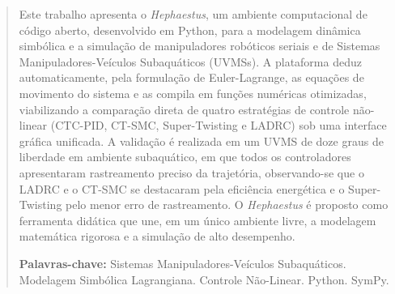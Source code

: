 \begin{abstract}
Este trabalho apresenta o \textit{Hephaestus}, um ambiente computacional de código aberto, desenvolvido em Python, para a modelagem dinâmica simbólica e a simulação de manipuladores robóticos seriais e de Sistemas Manipuladores-Veículos Subaquáticos (UVMSs). A plataforma deduz automaticamente, pela formulação de Euler-Lagrange, as equações de movimento do sistema e as compila em funções numéricas otimizadas, viabilizando a comparação direta de quatro estratégias de controle não-linear (CTC-PID, CT-SMC, Super-Twisting e LADRC) sob uma interface gráfica unificada. A validação é realizada em um UVMS de doze graus de liberdade em ambiente subaquático, em que todos os controladores apresentaram rastreamento preciso da trajetória, observando-se que o LADRC e o CT-SMC se destacaram pela eficiência energética e o Super-Twisting pelo menor erro de rastreamento. O \textit{Hephaestus} é proposto como ferramenta didática que une, em um único ambiente livre, a modelagem matemática rigorosa e a simulação de alto desempenho.

\textbf{Palavras-chave:} Sistemas Manipuladores-Veículos Subaquáticos. Modelagem Simbólica Lagrangiana. Controle Não-Linear. Python. SymPy.
\end{abstract}